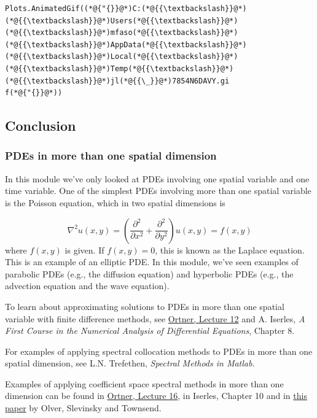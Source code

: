 \documentclass[12pt,a4paper]{article}
\begin{document}
\begin{lstlisting}
Plots.AnimatedGif((*@{"{}}@*)C:(*@{{\textbackslash}}@*)(*@{{\textbackslash}}@*)Users(*@{{\textbackslash}}@*)(*@{{\textbackslash}}@*)mfaso(*@{{\textbackslash}}@*)(*@{{\textbackslash}}@*)AppData(*@{{\textbackslash}}@*)(*@{{\textbackslash}}@*)Local(*@{{\textbackslash}}@*)(*@{{\textbackslash}}@*)Temp(*@{{\textbackslash}}@*)(*@{{\textbackslash}}@*)jl(*@{{\_}}@*)7854N6DAVY.gi
f(*@{"{}}@*))
\end{lstlisting}


\subsection{Conclusion}
\subsubsection{PDEs in more than one spatial dimension}
In this module we've only looked at PDEs involving one spatial variable and one time variable.  One of the simplest PDEs involving more than one spatial variable is the Poisson equation, which in two spatial dimensions is

\[
\nabla^2 u(x,y) = \left(\frac{\partial^2}{\partial x^2} + \frac{\partial^2}{\partial y^2}\right)u(x,y) = f(x,y)
\]
where $f(x,y)$ is given.  If $f(x,y) = 0$, this is known as the Laplace equation.  This is an example of an elliptic PDE.  In this module, we've seen examples of parabolic PDEs (e.g., the diffusion equation) and hyperbolic PDEs (e.g., the advection equation and the wave equation).

To learn about approximating solutions to PDEs in more than one spatial variable with finite difference methods, see \href{https://github.com/cortner/math405_2022/blob/main/notes/L12b-FDiff2D.ipynb}{Ortner, Lecture 12} and A. Iserles, \emph{A First Course in the Numerical Analysis of Differential Equations}, Chapter 8.  

For examples of applying spectral collocation methods to PDEs in more than one spatial dimension, see L.N. Trefethen, \emph{Spectral Methods in Matlab}.

Examples of applying coefficient space spectral methods in more than one dimension can be found in \href{https://github.com/cortner/math405_2022/blob/main/notes/L16-SpectralMethods-BVPs.ipynb}{Ortner, Lecture 16}, in Iserles, Chapter 10 and in \href{https://spiral.imperial.ac.uk/bitstream/10044/1/85269/6/OPs.pdf}{this paper} by Olver, Slevinsky and Townsend.
\end{document}
